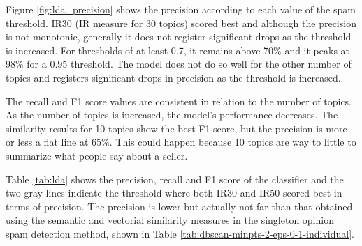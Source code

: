 \clearpage

Figure \ref{fig:lda_precision} shows the precision according to each value of the spam threshold. IR30 (IR measure for 30 topics) scored best and although the precision is not monotonic, generally it does not register significant drops as the threshold is increased. For thresholds of at least 0.7, it remains above 70\% and it peaks at 98\% for a 0.95 threshold. The model does not do so well for the other number of topics and registers significant drops in precision as the threshold is increased. 

The recall and F1 score values are consistent in relation to the number of topics. As the number of topics is increased, the model's performance decreases. The similarity results for 10 topics show the best F1 score, but the precision is more or less a flat line at 65\%. This could happen because 10 topics are way to little to summarize what people say about a seller. 

Table \ref{tab:lda} shows the precision, recall and F1 score of the classifier and the two gray lines indicate the threshold where both IR30 and IR50 scored best in terms of precision. The precision is lower but actually not far than that obtained using the semantic and vectorial similarity measures in the singleton opinion spam detection method, shown in Table \ref{tab:dbscan-minpts-2-eps-0-1-individual}. 

